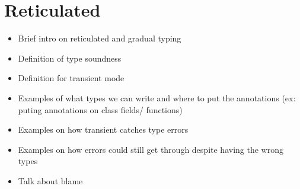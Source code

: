 
\section{Reticulated}
\begin{itemize}
\item Brief intro on reticulated and gradual typing
\item Definition of type soundness
\item Definition for transient mode
\item Examples of what types we can write and where to put the annotations (ex: puting annotations on class fields/ functions)
\item Examples on how transient catches type errors
\item Examples on how errors could still get through
  despite having the wrong types
\item  Talk about blame
\end{itemize}



